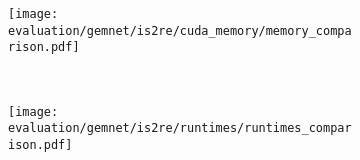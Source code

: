 \begin{figure}[H]
    \centering

    \begin{subfigure}[t]{0.48\textwidth}
        \centering
        \texttt{[image: evaluation/gemnet/is2re/cuda\_memory/memory\_comparison.pdf]}
        \label{fig:gemnet-is2re-memory-results}
    \end{subfigure}%
    ~
    \begin{subfigure}[t]{0.48\textwidth}
        \centering
        \texttt{[image: evaluation/gemnet/is2re/runtimes/runtimes\_comparison.pdf]}
        \label{gemnet-is2re-runtimes-results}
    \end{subfigure}
    
    \vspace*{-1em}


\end{figure}
